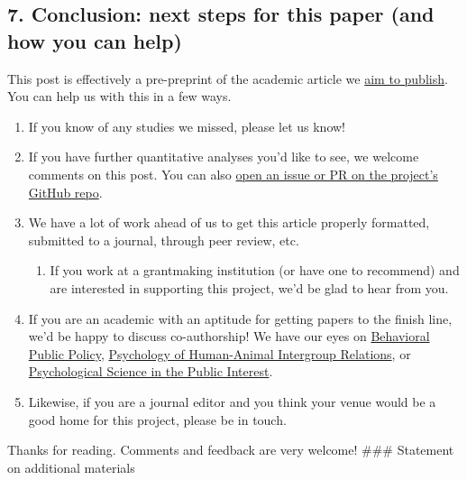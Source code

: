 \documentclass[
  letterpaper,
  DIV=11,
  numbers=noendperiod]{scrartcl}
\providecommand{\tightlist}{%
  \setlength{\itemsep}{0pt}\setlength{\parskip}{0pt}}\usepackage{longtable,booktabs,array}
\begin{document}
\hypertarget{conclusion-next-steps-for-this-paper-and-how-you-can-help}{%
\subsection{7. Conclusion: next steps for this paper (and how you can
help)}\label{conclusion-next-steps-for-this-paper-and-how-you-can-help}}

This post is effectively a pre-preprint of the academic article we
\href{https://forum.effectivealtruism.org/posts/xbiJRzSJKq69RRHDd/why-you-should-publish-your-research-in-academic-fashion}{aim
to publish}. You can help us with this in a few ways.

\begin{enumerate}
\def\labelenumi{\arabic{enumi}.}
\tightlist
\item
  If you know of any studies we missed, please let us know!
\item
  If you have further quantitative analyses you'd like to see, we
  welcome comments on this post. You can also
  \href{https://github.com/setgree/vegan-meta}{open an issue or PR on
  the project's GitHub repo}.
\item
  We have a lot of work ahead of us to get this article properly
  formatted, submitted to a journal, through peer review, etc.

  \begin{enumerate}
  \def\labelenumii{\arabic{enumii}.}
  \tightlist
  \item
    If you work at a grantmaking institution (or have one to recommend)
    and are interested in supporting this project, we'd be glad to hear
    from you.
  \end{enumerate}
\item
  If you are an academic with an aptitude for getting papers to the
  finish line, we'd be happy to discuss co-authorship! We have our eyes
  on
  \href{https://www.cambridge.org/core/journals/behavioural-public-policy}{Behavioral
  Public Policy},
  \href{https://phair.psychopen.eu/index.php/phair}{Psychology of
  Human-Animal Intergroup Relations}, or
  \href{https://journals.sagepub.com/home/psi}{Psychological Science in
  the Public Interest}.
\item
  Likewise, if you are a journal editor and you think your venue would
  be a good home for this project, please be in touch.
\end{enumerate}

Thanks for reading. Comments and feedback are very welcome! \#\#\#
Statement on additional materials
\end{document}
